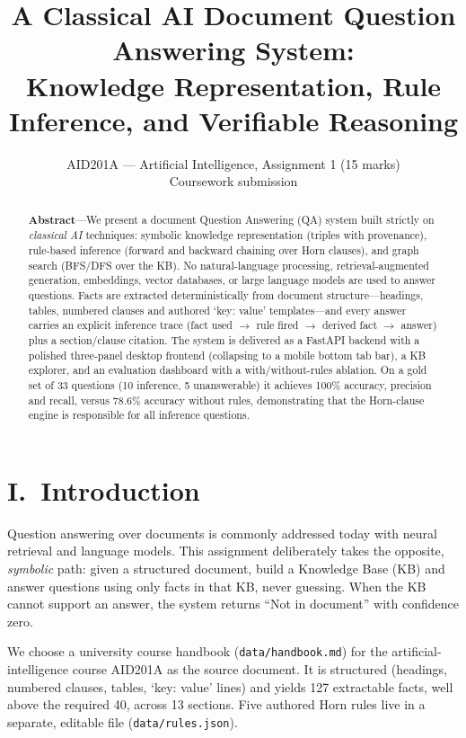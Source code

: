 \documentclass[10pt,twocolumn]{article}
\title{\textbf{A Classical AI Document Question Answering System:\\Knowledge Representation, Rule Inference, and Verifiable Reasoning}}
\author{AID201A --- Artificial Intelligence, Assignment 1 (15 marks)\\
Coursework submission}
\date{}
\begin{document}
\maketitle
\thispagestyle{empty}

\begin{abstract}
\textbf{Abstract}---We present a document Question Answering (QA) system built
strictly on \emph{classical AI} techniques: symbolic knowledge representation
(triples with provenance), rule-based inference (forward and backward chaining
over Horn clauses), and graph search (BFS/DFS over the KB). No natural-language
processing, retrieval-augmented generation, embeddings, vector databases, or
large language models are used to answer questions. Facts are extracted
deterministically from document structure---headings, tables, numbered clauses
and authored `key: value' templates---and every answer carries an explicit
inference trace (fact used $\rightarrow$ rule fired $\rightarrow$ derived fact
$\rightarrow$ answer) plus a section/clause citation. The system is delivered as
a FastAPI backend with a polished three-panel desktop frontend (collapsing to a
mobile bottom tab bar), a KB explorer, and an evaluation dashboard with a
with/without-rules ablation. On a gold set of 33 questions (10 inference,
5 unanswerable) it achieves 100\% accuracy, precision and recall, versus
78.6\% accuracy without rules, demonstrating that the Horn-clause engine is
responsible for all inference questions.
\end{abstract}

\section*{I.~Introduction}
Question answering over documents is commonly addressed today with neural
retrieval and language models. This assignment deliberately takes the opposite,
\emph{symbolic} path: given a structured document, build a Knowledge Base (KB)
and answer questions using only facts in that KB, never guessing. When the KB
cannot support an answer, the system returns ``Not in document'' with confidence
zero.

We choose a university course handbook (\texttt{data/handbook.md}) for the
artificial-intelligence course AID201A as the source document. It is structured
(headings, numbered clauses, tables, `key: value' lines) and yields 127
extractable facts, well above the required 40, across 13 sections. Five authored
Horn rules live in a separate, editable file (\texttt{data/rules.json}).
\end{document}
